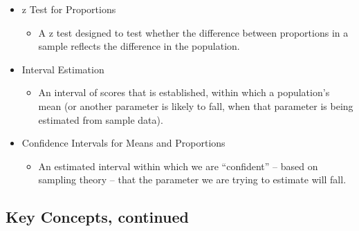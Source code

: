 \documentclass[]{article}
\begin{document}
\begin{itemize}
\itemsep1pt\parskip0pt
\item
  z Test for Proportions

  \begin{itemize}
  \itemsep1pt\parskip0pt
  \item
    A z test designed to test whether the difference between proportions
    in a sample reflects the difference in the population.
  \end{itemize}
\item
  Interval Estimation

  \begin{itemize}
  \itemsep1pt\parskip0pt
  \item
    An interval of scores that is established, within which a
    population's mean (or another parameter is likely to fall, when that
    parameter is being estimated from sample data).
  \end{itemize}
\item
  Confidence Intervals for Means and Proportions

  \begin{itemize}
  \itemsep1pt\parskip0pt
  \item
    An estimated interval within which we are ``confident'' -- based on
    sampling theory -- that the parameter we are trying to estimate will
    fall.
  \end{itemize}
\end{itemize}

\subsection{Key Concepts, continued}\label{key-concepts-continued-3}
\end{document}
